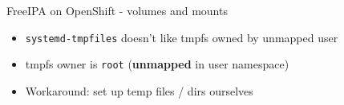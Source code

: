 \begin{frame}{FreeIPA on OpenShift - volumes and mounts}
\protect\hypertarget{freeipa-openshift-challenges-volumes}{}

\begin{itemize}
\item {\tt systemd-tmpfiles} doesn't like tmpfs owned by unmapped user
\item tmpfs owner is {\tt root} ({\bf unmapped} in user namespace)
\item Workaround: set up temp files / dirs ourselves
\end{itemize}

\end{frame}
